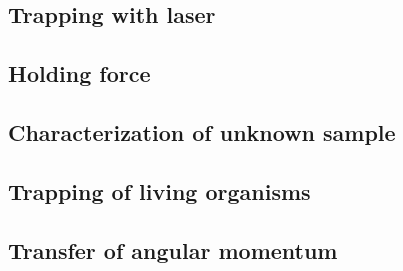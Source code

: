 \documentclass[12pt,english]{scrartcl}
\begin{document}
\subsection{Trapping with laser}

\subsection{Holding force}

\subsection{Characterization of unknown sample}

\subsection{Trapping of living organisms}

\subsection{Transfer of angular momentum}

\newpage
\printbibliography
\listoffigures
\listoftables
\end{document}
